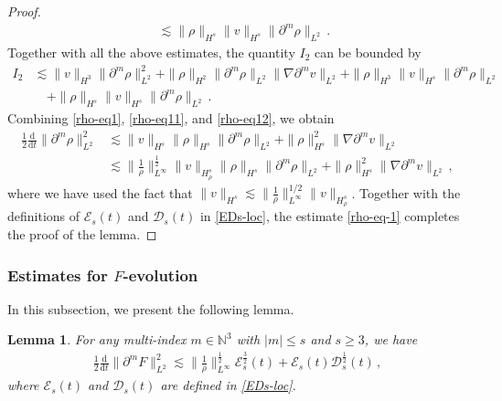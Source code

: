 \documentclass[reqno,11pt]{amsart}
\newtheorem{lemma}{Lemma}[section]
\numberwithin{equation}{section}
\def\p{\partial}
\def\d{\mathrm{d}}
\begin{document}
\begin{proof}
\begin{equation*}
\begin{aligned}
\quad \lesssim \|\rho\|_{H^s} \|v\|_{H^s} \|\partial^m \rho\|_{L^2}\,.
	\end{aligned}
\end{equation*}
Together with all the above estimates, the quantity $I_2$ can be bounded by
\begin{equation}\label{rho-eq12}
	\begin{aligned}
	I_2&\lesssim\|v\|_{H^3}\|\p^m\rho\|^2_{L^2}+\|\rho\|_{H^2}\|\p^m\rho\|_{L^2}\|\nabla\p^m v\|_{L^2}	+\|\rho\|_{H^3}\|v\|_{H^s}\|\p^m\rho\|_{L^2}\\
		&\quad+\|\rho\|_{H^s}	\| v\|_{H^s}\|\p^m\rho\|_{L^2}	\,.
	\end{aligned}
\end{equation}
Combining \eqref{rho-eq1}, \eqref{rho-eq11}, and \eqref{rho-eq12}, we obtain
\begin{equation}\label{rho-eq-1}
	\begin{aligned}
	\tfrac{1}{2} \tfrac{\d}{\d t} \|\partial^{m}\rho\|^{2}_{L^{2}} &\lesssim\|v\|_{H^s}\|\rho\|_{H^s}\|\p^m\rho\|_{L^2}+\|\rho\|^2_{H^s}\|\nabla\p^m v\|_{L^2}	\\
		&\lesssim \|\tfrac{1}{\rho}\|^{\tfrac{1}{2}}_{L^\infty}\|v\|_{H_\rho^s}\|\rho\|_{H^s}\|\partial^{m}\rho\|_{L^2}
		+\|\rho\|^2_{H^s}\|\nabla\p^m v\|_{L^2}
		 \,,
	\end{aligned}
\end{equation}
where we have used the fact that $\| v \|_{H^s} \lesssim \| \frac{1}{\rho} \|^{1/2}_{L^\infty} \| v \|_{H^s_\rho}$. Together with the definitions of $\mathcal{E}_s (t)$ and $\mathcal{D}_s (t)$ in \eqref{EDs-loc}, the estimate \eqref{rho-eq-1} completes the proof of the lemma.
\end{proof}

\subsubsection{\bf Estimates for $F$-evolution}

In this subsection, we present the following lemma.

\begin{lemma}\label{Lmm-F-loc}
    For any multi-index $m \in \mathbb{N}^3$ with $|m| \leq s$ and $s \geq 3$, we have
    \begin{equation}\label{F-eq}
	\begin{aligned}
		\tfrac{1}{2} \tfrac{\d}{\d t} \|\partial^{m}F\|^{2}_{L^{2}} \lesssim \|\tfrac{1}{\rho}\|^{\tfrac{1}{2}}_{L^\infty} \mathcal{E}_s^\frac{3}{2} (t) + \mathcal{E}_s (t) \mathcal{D}_s^\frac{1}{2} (t) \,,
        \end{aligned}
    \end{equation}
    where $\mathcal{E}_s (t)$ and $\mathcal{D}_s (t)$ are defined in \eqref{EDs-loc}.
\end{lemma}
\end{document}
